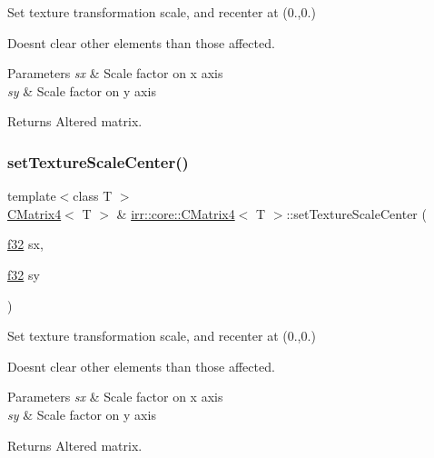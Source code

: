 Set texture transformation scale, and recenter at (0.,0.) 

Doesn\textquotesingle{}t clear other elements than those affected. 
\begin{DoxyParams}{Parameters}
{\em sx} & Scale factor on x axis \\
\hline
{\em sy} & Scale factor on y axis \\
\hline
\end{DoxyParams}
\begin{DoxyReturn}{Returns}
Altered matrix. 
\end{DoxyReturn}
\mbox{\label{classirr_1_1core_1_1CMatrix4_adbd668867d117dc9331e68abef0af221}} 
\subsubsection{\texorpdfstring{set\+Texture\+Scale\+Center()}{setTextureScaleCenter()}\hspace{0.1cm}{\footnotesize\ttfamily [2/2]}}
{\footnotesize\ttfamily template$<$class T $>$ \\
\hyperlink{classirr_1_1core_1_1CMatrix4}{C\+Matrix4}$<$ T $>$ \& \hyperlink{classirr_1_1core_1_1CMatrix4}{irr\+::core\+::\+C\+Matrix4}$<$ T $>$\+::set\+Texture\+Scale\+Center (\begin{DoxyParamCaption}\item[{\hyperlink{namespaceirr_a0277be98d67dc26ff93b1a6a1d086b07}{f32}}]{sx,  }\item[{\hyperlink{namespaceirr_a0277be98d67dc26ff93b1a6a1d086b07}{f32}}]{sy }\end{DoxyParamCaption})\hspace{0.3cm}{\ttfamily [inline]}}



Set texture transformation scale, and recenter at (0.,0.) 

Doesn\textquotesingle{}t clear other elements than those affected. 
\begin{DoxyParams}{Parameters}
{\em sx} & Scale factor on x axis \\
\hline
{\em sy} & Scale factor on y axis \\
\hline
\end{DoxyParams}
\begin{DoxyReturn}{Returns}
Altered matrix. 
\end{DoxyReturn}
\mbox{\label{classirr_1_1core_1_1CMatrix4_a2bab9633697a892f08d89c7aeee6daf6}} 
